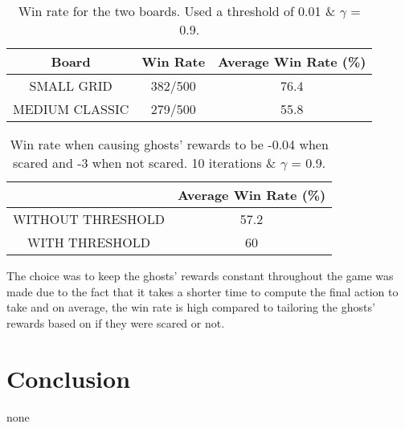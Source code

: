 \documentclass[12pt]{report}
\begin{document}
        \begin{table}[h!]
          \begin{center}
            \begin{tabular}{c|c|c}
              \textbf{Board} & \textbf{Win Rate} & \textbf{Average Win Rate (\%)} \\
              \hline
              SMALL GRID & 382/500 & 76.4\\
              MEDIUM CLASSIC & 279/500 & 55.8\\
            \end{tabular}
            \caption{Win rate for the two boards. Used a threshold of 0.01 \& $\gamma$ = 0.9.}
            \label{tab:table3}
          \end{center}
        \end{table}

        \begin{table}[h!]
          \begin{center}
            \begin{tabular}{c|c}
              \textbf{} & \textbf{Average Win Rate (\%)} \\
              \hline
              WITHOUT THRESHOLD & 57.2\\
              WITH THRESHOLD & 60\\
            \end{tabular}
            \caption{Win rate when causing ghosts' rewards to be -0.04 when scared and -3 when not scared. 10 iterations \& $\gamma$ = 0.9.}
            \label{tab:table4}
          \end{center}
        \end{table}

          The choice was to keep the ghosts' rewards constant throughout the game was made due to the fact that it takes a shorter time to compute the final action to take and on average, the win rate is high compared to tailoring the ghosts' rewards based on if they were scared or not.




  \section*{Conclusion}
  none
\end{document}
